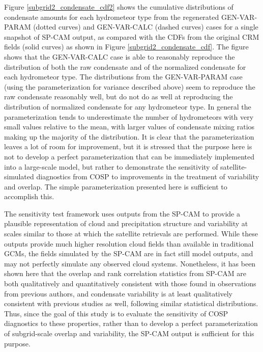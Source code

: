 Figure \ref{subgrid2_condensate_cdf2} shows the cumulative distributions of condensate amounts for each hydrometeor type from the regenerated GEN-VAR-PARAM (dotted curves) and GEN-VAR-CALC (dashed curves) cases for a single snapshot of SP-CAM output, as compared with the CDFs from the original CRM fields (solid curves) as shown in Figure \ref{subgrid2_condensate_cdf}. The figure shows that the GEN-VAR-CALC case is able to reasonably reproduce the distribution of both the raw condensate and of the normalized condensate for each hydrometeor type. The distributions from the GEN-VAR-PARAM case (using the parameterization for variance described above) seem to reproduce the raw condensate reasonably well, but do not do as well at reproducing the distribution of normalized condensate for any hydrometeor type. In general the parameterization tends to underestimate the number of hydrometeors with very small values relative to the mean, with larger values of condensate mixing ratios making up the majority of the distribution. It is clear that the parameterization leaves a lot of room for improvement, but it is stressed that the purpose here is not to develop a perfect parameterization that can be immediately implemented into a large-scale model, but rather to demonstrate the sensitivity of satellite-simulated diagnostics from COSP to improvements in the treatment of variability and overlap. The simple parameterization presented here is sufficient to accomplish this.

The sensitivity test framework uses outputs from the SP-CAM to provide a plausible representation of cloud and precipitation structure and variability at scales similar to those at which the satellite retrievals are performed. While these outputs provide much higher resolution cloud fields than available in traditional GCMs, the fields simulated by the SP-CAM are in fact still model outputs, and may not perfectly simulate any observed cloud systems. Nonetheless, it has been shown here that the overlap and rank correlation statistics from SP-CAM are both qualitatively and quantitatively consistent with those found in observations from previous authors, and condensate variability is at least qualitatively consistent with previous studies as well, following similar statistical distributions. Thus, since the goal of this study is to evaluate the sensitivity of COSP diagnostics to these properties, rather than to develop a perfect parameterization of subgrid-scale overlap and variability, the SP-CAM output is sufficient for this purpose. %

